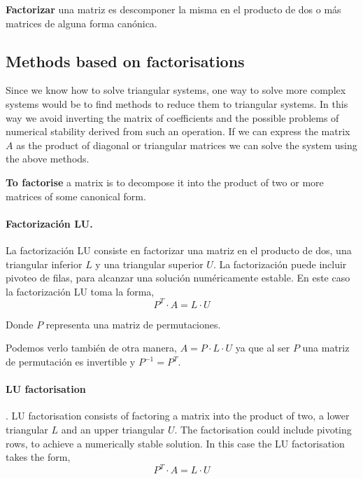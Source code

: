 \begin{paracol}{2}
\textbf{Factorizar} una matriz es descomponer la misma en el producto de dos o más matrices de alguna forma canónica.

\switchcolumn
\subsection{Methods based on factorisations}

Since we know how to solve triangular systems, one way to solve more complex systems would be to find methods to reduce them to triangular systems. In this way we avoid inverting the matrix of coefficients and the possible problems of numerical stability derived from such an operation. If we can express the matrix $A$ as the product of diagonal or triangular matrices we can solve the system using the above methods. 

\textbf{To factorise} a matrix is to decompose it into the product of two or more matrices of some canonical form.

\switchcolumn
\paragraph{Factorización LU.} La factorización LU consiste en factorizar una matriz en el producto de dos, una triangular inferior $L$ y una triangular superior $U$. La factorización puede incluir pivoteo de filas, para alcanzar una solución numéricamente estable. En este caso la factorización LU toma la forma,
\begin{equation*}
P^T\cdot A = L\cdot U
\end{equation*}

Donde $P$ representa una matriz de permutaciones.

Podemos verlo también de otra manera, $A=P \cdot L \cdot U$ ya que al ser $P$ una matriz de permutación es invertible y $P^{-1}=P^T$.

\switchcolumn

\paragraph{LU factorisation}. LU factorisation consists of factoring a matrix into the product of two, a lower triangular $L$ and an upper triangular $U$. The factorisation could include pivoting rows, to achieve a numerically stable solution. In this case the LU factorisation takes the form,
\begin{equation*}
P^T \cdot A = L\cdot U
\end{equation*}


\end{paracol}
